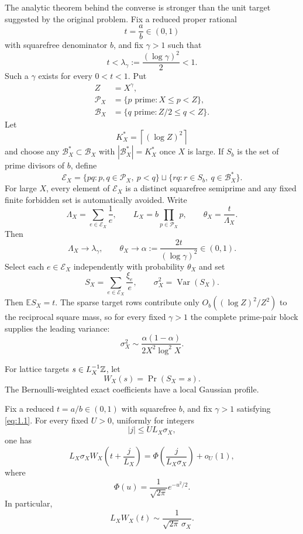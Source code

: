 The analytic theorem behind the converse is stronger than the unit target suggested by the original problem. Fix a reduced proper rational
\[
t=\frac ab\in(0,1)
\]
with squarefree denominator $b$, and fix $\gamma>1$ such that
\[
t<\lambda_\gamma:=\frac{(\log\gamma)^2}{2}<1.
\tag{1.1}\label{eq:1.1}
\]
Such a $\gamma$ exists for every $0<t<1$. Put
\[
\begin{aligned}
Z&=X^\gamma,\\
\mathcal P_X&=\{p\text{ prime}:X\le p<Z\},\\
\mathcal B_X&=\{q\text{ prime}:Z/2\le q<Z\}.
\end{aligned}
\tag{1.2}\label{eq:1.2}
\]
Let
\[
K_X^*=\left\lceil(\log Z)^2\right\rceil
\]
and choose any $\mathcal B_X^*\subset\mathcal B_X$ with $|\mathcal B_X^*|=K_X^*$ once $X$ is large. If $S_b$ is the set of prime divisors of $b$, define
\[
\mathcal E_X
=
\{pq:p,q\in\mathcal P_X,\ p<q\}
\sqcup
\{rq:r\in S_b,\ q\in\mathcal B_X^*\}.
\tag{1.3}\label{eq:1.3}
\]
For large $X$, every element of $\mathcal E_X$ is a distinct squarefree semiprime and any fixed finite forbidden set is automatically avoided. Write
\[
\Lambda_X=\sum_{e\in\mathcal E_X}\frac1e,
\qquad
L_X=b\prod_{p\in\mathcal P_X}p,
\qquad
\theta_X=\frac{t}{\Lambda_X}.
\tag{1.4}\label{eq:1.4}
\]
Then
\[
\Lambda_X\longrightarrow\lambda_\gamma,
\qquad
\theta_X\longrightarrow
\alpha:=\frac{2t}{(\log\gamma)^2}\in(0,1).
\tag{1.5}\label{eq:1.5}
\]
Select each $e\in\mathcal E_X$ independently with probability $\theta_X$ and set
\[
S_X=\sum_{e\in\mathcal E_X}\frac{\xi_e}{e},
\qquad
\sigma_X^2=\operatorname{Var}(S_X).
\tag{1.6}\label{eq:1.6}
\]
Then $\mathbb E S_X=t$. The sparse target rows contribute only $O_b((\log Z)^2/Z^2)$ to the reciprocal square mass, so for every fixed $\gamma>1$ the complete prime-pair block supplies the leading variance:
\[
\sigma_X^2
\sim
\frac{\alpha(1-\alpha)}{2X^2\log^2X}.
\tag{1.7}\label{eq:1.7}
\]

For lattice targets $s\in L_X^{-1}\mathbb Z$, let
\[
W_X(s)=\Pr(S_X=s).
\]
The Bernoulli-weighted exact coefficients have a local Gaussian profile.

\begin{theorem}\label{thm:local-profile}
Fix a reduced $t=a/b\in(0,1)$ with squarefree $b$, and fix $\gamma>1$ satisfying \eqref{eq:1.1}. For every fixed $U>0$, uniformly for integers
\[
|j|\le U L_X\sigma_X,
\]
one has
\[
L_X\sigma_X
W_X\!\left(t+\frac{j}{L_X}\right)
=
\Phi\!\left(\frac{j}{L_X\sigma_X}\right)+o_U(1),
\tag{1.8}\label{eq:1.8}
\]
where
\[
\Phi(u)=\frac1{\sqrt{2\pi}}e^{-u^2/2}.
\]
In particular,
\[
L_XW_X(t)
\sim
\frac1{\sqrt{2\pi}\,\sigma_X}.
\tag{1.9}\label{eq:1.9}
\]
\end{theorem}

